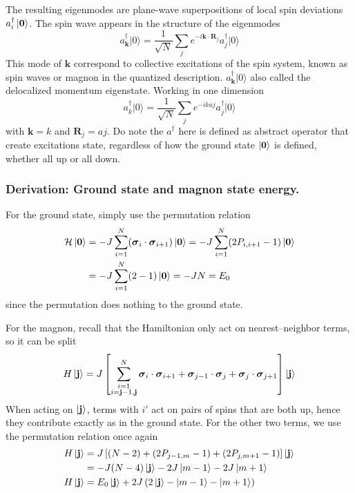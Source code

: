 \documentclass[../../../main.tex]{subfiles}
\begin{document}
The resulting eigenmodes are plane-wave superpositions of local spin deviations $a_i ^\dagger \ket{\mathbf{0}}$.
The spin wave appears in the structure of the eigenmodes
\begin{equation*}
    a_{\mathbf{k}}^ \dagger\lvert 0\rangle = \frac{1}{\sqrt{N}} \sum_{j} e^{-i\mathbf{k}\cdot\mathbf{R}_{j}} a_{j}^ \dagger\lvert 0\rangle
\end{equation*}
This mode of $\mathbf{k}$ correspond to collective excitations of the spin system, known as spin waves or magnon in the quantized description.
$a_{\mathbf{k}}^ \dagger\lvert 0\rangle$ also called the delocalized momentum eigenstate.
Working in one dimension
\begin{equation*}
    a_{k}^ \dagger\lvert 0\rangle = \frac{1}{\sqrt{N}} \sum_{j} e^{-ikaj} a_{j}^ \dagger\lvert 0\rangle
\end{equation*}
with $\mathbf{k }=k$ and $\mathbf{R}_j = aj$.
Do note the $a ^\dagger$ here is defined as abstract operator that create excitations state, regardless of how the ground state $\ket{\mathbf{0}}$ is defined, whether all up or all down.

\subsubsection{Derivation: Ground state and magnon state energy.}
For the ground state, simply use the permutation relation
\begin{align*}
    \mathcal H \ket{\mathbf{0}} & =  -J \sum_{i=1}^{N} (\boldsymbol{\sigma}_i\cdot\boldsymbol{\sigma}_{i+1}) \ket{\mathbf{0}}
    = -J \sum_{i=1}^{N} (2P_{i,i+1}-1)\ket{\mathbf{0}}                                                                        \\
                                & =  -J \sum_{i=1}^{N} (2-1)\ket{\mathbf{0}}
    = -J N = E_0
\end{align*}
since the permutation does nothing to the ground state.

For the magnon, recall that the Hamiltonian only act on nearest–neighbor terms, so it can be split
\begin{equation*}
    H \ket{\mathbf{j}} = J \left[ \sum_{\substack{i=1\\i = \mathbf{j}-1,\mathbf{j}}}^N \boldsymbol{\sigma}_i \cdot \boldsymbol{\sigma}_{i+1} + \boldsymbol{\sigma}_{j-1} \cdot \boldsymbol{\sigma}_{j} + \boldsymbol{\sigma}_j \cdot \boldsymbol{\sigma}_{j+1}\right]  \ket{\mathbf{j}}
\end{equation*}
When acting on $\ket{\mathbf{j}}$, terms with $i'$ act on pairs of spins that are both up, hence they contribute exactly as in the ground state.
For the other two terms, we use the permutation relation once again
\begin{align*}
    H \ket{\mathbf{j}}
     & =   J\left[ (N-2)+ (2P_{j-1,m}-1) + (2P_{j,m+1}-1) \right] \ket{\mathbf{j}}        \\
     & = -J(N-4) \ket{\mathbf{j}} - 2J \ket{m-1} - 2J \ket{m+1}                           \\
    H \ket{\mathbf{j}}
     & = E_0 \ket{\mathbf{j}} +2J \left(2 \ket{\mathbf{j}}-  \ket{m-1}- \ket{m+1} \right)
\end{align*}
\end{document}

